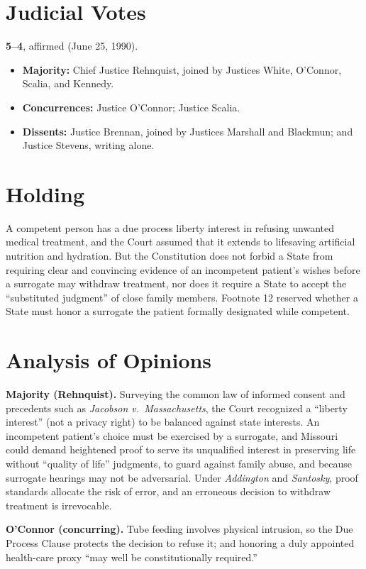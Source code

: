 \documentclass[12pt]{article}
\begin{document}
\section{Judicial Votes}

\textbf{5--4}, affirmed (June 25, 1990).
\begin{itemize}
\item \textbf{Majority:} Chief Justice Rehnquist, joined by Justices White, O'Connor, Scalia, and Kennedy.
\item \textbf{Concurrences:} Justice O'Connor; Justice Scalia.
\item \textbf{Dissents:} Justice Brennan, joined by Justices Marshall and Blackmun; and Justice Stevens, writing alone.
\end{itemize}

\section{Holding}

A competent person has a due process liberty interest in refusing unwanted medical treatment, and the Court assumed that it extends to lifesaving artificial nutrition and hydration. But the Constitution does not forbid a State from requiring clear and convincing evidence of an incompetent patient's wishes before a surrogate may withdraw treatment, nor does it require a State to accept the ``substituted judgment'' of close family members. Footnote 12 reserved whether a State must honor a surrogate the patient formally designated while competent.

\section{Analysis of Opinions}

\textbf{Majority (Rehnquist).} Surveying the common law of informed consent and precedents such as \textit{Jacobson v.\ Massachusetts}, the Court recognized a ``liberty interest'' (not a privacy right) to be balanced against state interests. An incompetent patient's choice must be exercised by a surrogate, and Missouri could demand heightened proof to serve its unqualified interest in preserving life without ``quality of life'' judgments, to guard against family abuse, and because surrogate hearings may not be adversarial. Under \textit{Addington} and \textit{Santosky}, proof standards allocate the risk of error, and an erroneous decision to withdraw treatment is irrevocable.

\textbf{O'Connor (concurring).} Tube feeding involves physical intrusion, so the Due Process Clause protects the decision to refuse it; and honoring a duly appointed health-care proxy ``may well be constitutionally required.''
\end{document}
